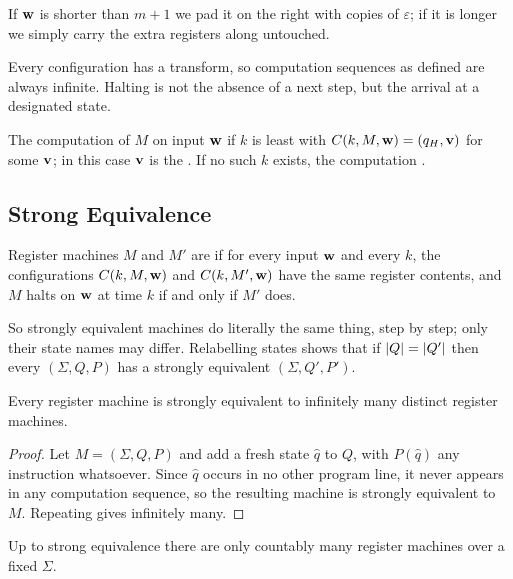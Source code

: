 \documentclass[a4paper]{scrartcl}
\newcommand{\eps}{\varepsilon}
\begin{document}
If $\mathbf{w}$ is shorter than $m+1$ we pad it on the right with copies of $\eps$; if it is longer we simply carry the extra registers along untouched.

\begin{remark}
	Every configuration has a transform, so computation sequences as defined are always infinite. Halting is not the absence of a next step, but the arrival at a designated state.
\end{remark}

\begin{definition}[Halting]
	The computation of $M$ on input $\mathbf{w}$  if $k$ is least with $C(k,M,\mathbf{w}) = (q_H, \mathbf{v})$ for some $\mathbf{v}$; in this case $\mathbf{v}$ is the . If no such $k$ exists, the computation .
\end{definition}

\subsection{Strong Equivalence}

\begin{definition}
	Register machines $M$ and $M'$ are  if for every input $\mathbf{w}$ and every $k$, the configurations $C(k,M,\mathbf{w})$ and $C(k,M',\mathbf{w})$ have the same register contents, and $M$ halts on $\mathbf{w}$ at time $k$ if and only if $M'$ does.
\end{definition}

So strongly equivalent machines do literally the same thing, step by step; only their state names may differ. Relabelling states shows that if $\lvert Q\rvert = \lvert Q'\rvert$ then every $(\Sigma,Q,P)$ has a strongly equivalent $(\Sigma,Q',P')$.

\begin{proposition}\label{prop:padding}
	Every register machine is strongly equivalent to infinitely many distinct register machines.
\end{proposition}

\begin{proof}
	Let $M = (\Sigma,Q,P)$ and add a fresh state $\hat q$ to $Q$, with $P(\hat q)$ any instruction whatsoever. Since $\hat q$ occurs in no other program line, it never appears in any computation sequence, so the resulting machine is strongly equivalent to $M$. Repeating gives infinitely many.
\end{proof}

\begin{proposition}\label{prop:countablymanyrm}
	Up to strong equivalence there are only countably many register machines over a fixed $\Sigma$.
\end{proposition}
\end{document}
